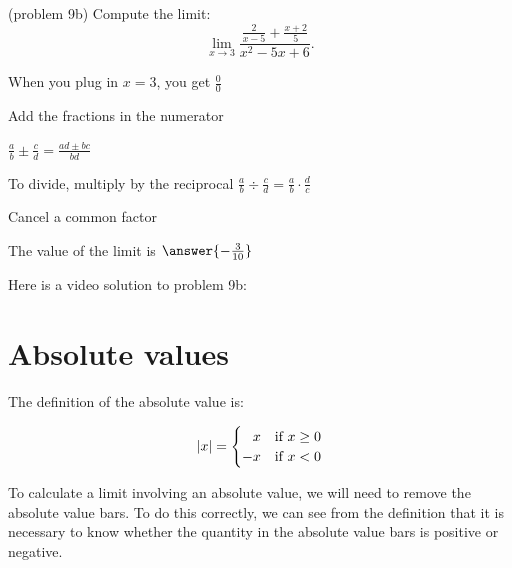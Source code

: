 \documentclass[handout]{ximera}
\begin{document}
\begin{problem}(problem 9b)
  Compute the limit:
  \[
    \lim_{x \to 3} \frac{\frac{2}{x-5} + \frac{x+2}{5}}{x^2 - 5x + 6}.
  \]
  
    \begin{hint}
      When you plug in $x = 3$, you get $\frac00$
    \end{hint}
    \begin{hint}
      Add the fractions in the numerator
    \end{hint}
    \begin{hint}
      $\frac{a}{b} \pm \frac{c}{d} = \frac{ad \pm bc}{bd}$
    \end{hint}
    \begin{hint}
      To divide, multiply by the reciprocal $\frac{a}{b} \div \frac{c}{d} = \frac{a}{b} \cdot \frac{d}{c}$ 
    \end{hint}
    \begin{hint}
      Cancel a common factor
    \end{hint}
		The value of the limit is
		 $\answer{-\frac{3}{10}}$
		
\end{problem}


Here is a video solution to problem 9b:
\begin{foldable}
\end{foldable}

\section{Absolute values}


The definition of the absolute value is:

\[
\left | x \right | = 
\begin{cases}
\hfill x & \text{if $x\geq 0$}\\         -x & \text{if $x<0$}
\end{cases}
\] 

To calculate a limit involving an absolute value, we will need to remove the absolute value bars. 
To do this correctly, we can see from the definition that it is necessary to know whether the 
quantity in the absolute value bars is positive or negative.
\end{document}
